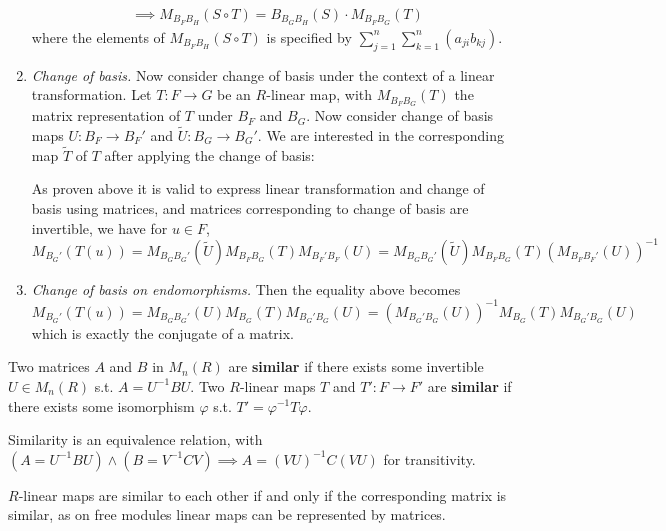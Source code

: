 \documentclass{article}
\begin{document}
\begin{remark}
\begin{enumerate}
\begin{align*}
            & \implies M_{B_F B_H} (S\circ T) = B_{B_G B_H}(S) \cdot M_{B_F B_G}(T)
        \end{align*}
        where the elements of $M_{B_F B_H} (S\circ T)$ is specified by $\sum_{j=1}^{n}\sum_{k=1}^{n} (a_{ji} b_{kj})$.
        \item \emph{Change of basis.} Now consider change of basis under the context of a linear transformation. Let $T: F\to G$ be an $R$-linear map, with $M_{B_F B_G}(T)$ the matrix representation of $T$ under $B_F$ and $B_G$. Now consider change of basis maps $U: B_F\to B_F'$ and $\tilde{U}: B_G \to B_G'$. We are interested in the corresponding map $\tilde{T}$ of $T$ after applying the change of basis:
        \begin{figure}[htbp]
            \centering
        \end{figure}

        As proven above it is valid to express linear transformation and change of basis using matrices, and matrices corresponding to change of basis are invertible, we have for $u\in F$,
        \[
            M_{B_G'}(T(u)) = M_{B_G B_G'}(\tilde{U}) M_{B_F B_G}(T) M_{B_F' B_F}(U) = M_{B_G B_G'}(\tilde{U}) M_{B_F B_G}(T) (M_{B_F B_F'}(U))^{-1}
        \]
        \item \emph{Change of basis on endomorphisms.} Then the equality above becomes
        \[
            M_{B_G'}(T(u)) = M_{B_G B_G'}(U) M_{B_G}(T) M_{B_G' B_G}(U) = (M_{B_G' B_G}(U))^{-1} M_{B_G}(T) M_{B_G' B_G}(U)
        \]
        which is exactly the conjugate of a matrix. 
    \end{enumerate}
\end{remark}

\begin{definition}
    Two matrices $A$ and $B$ in $M_n(R)$ are \textbf{similar} if there exists some invertible $U\in M_n(R)$ s.t. $A = U^{-1}B U$. Two $R$-linear maps $T$ and $T': F \to F'$ are \textbf{similar} if there exists some isomorphism $\varphi$ s.t. $T' = \varphi^{-1} T \varphi$. 
\end{definition}

\begin{remark}
    Similarity is an equivalence relation, with $(A = U^{-1}BU) \wedge (B = V^{-1}CV) \implies A = (VU)^{-1}C(VU)$ for transitivity.

    $R$-linear maps are similar to each other if and only if the corresponding matrix is similar, as on free modules linear maps can be represented by matrices.
\end{remark}
\end{document}
